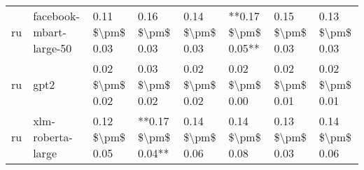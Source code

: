 \begin{tabular}{llllllll}
      ru &            facebook-mbart-large-50 & 0.11 \$\textbackslash pm\$ 0.03 &           0.16 \$\textbackslash pm\$ 0.03 &       0.14 \$\textbackslash pm\$ 0.03 &    **0.17 \$\textbackslash pm\$ 0.05** &                         0.15 \$\textbackslash pm\$ 0.03 &     0.13 \$\textbackslash pm\$ 0.03 \\
      ru &                               gpt2 & 0.02 \$\textbackslash pm\$ 0.02 &           0.03 \$\textbackslash pm\$ 0.02 &       0.02 \$\textbackslash pm\$ 0.02 &        0.02 \$\textbackslash pm\$ 0.00 &                         0.02 \$\textbackslash pm\$ 0.01 &     0.02 \$\textbackslash pm\$ 0.01 \\
      ru &                  xlm-roberta-large & 0.12 \$\textbackslash pm\$ 0.05 &       **0.17 \$\textbackslash pm\$ 0.04** &       0.14 \$\textbackslash pm\$ 0.06 &        0.14 \$\textbackslash pm\$ 0.08 &                         0.13 \$\textbackslash pm\$ 0.03 &     0.14 \$\textbackslash pm\$ 0.06 \\
\bottomrule
\end{tabular}
